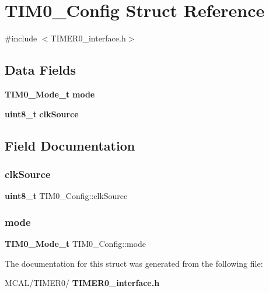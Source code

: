 \section{T\+I\+M0\+\_\+\+Config Struct Reference}
\label{struct_t_i_m0___config}


{\ttfamily \#include $<$T\+I\+M\+E\+R0\+\_\+interface.\+h$>$}

\subsection*{Data Fields}
\begin{DoxyCompactItemize}
\item 
\textbf{ T\+I\+M0\+\_\+\+Mode\+\_\+t} \textbf{ mode}
\item 
\textbf{ uint8\+\_\+t} \textbf{ clk\+Source}
\end{DoxyCompactItemize}


\subsection{Field Documentation}
\mbox{\label{struct_t_i_m0___config_a631b1a034b6852e9ab5bb3cb740ea009}} 
\subsubsection{clk\+Source}
{\footnotesize\ttfamily \textbf{ uint8\+\_\+t} T\+I\+M0\+\_\+\+Config\+::clk\+Source}

\mbox{\label{struct_t_i_m0___config_add61648f414fdf945227052099adedbf}} 
\subsubsection{mode}
{\footnotesize\ttfamily \textbf{ T\+I\+M0\+\_\+\+Mode\+\_\+t} T\+I\+M0\+\_\+\+Config\+::mode}



The documentation for this struct was generated from the following file\+:\begin{DoxyCompactItemize}
\item 
M\+C\+A\+L/\+T\+I\+M\+E\+R0/\textbf{ T\+I\+M\+E\+R0\+\_\+interface.\+h}\end{DoxyCompactItemize}
